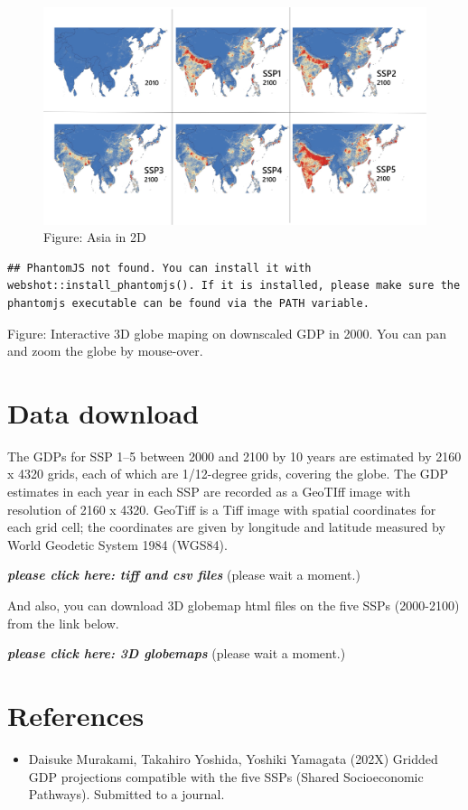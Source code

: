 \documentclass[]{book}
\providecommand{\tightlist}{%
  \setlength{\itemsep}{0pt}\setlength{\parskip}{0pt}}
\begin{document}
\begin{figure}
\centering
\includegraphics{Asia.png}
\caption{Figure: Asia in 2D}
\end{figure}

\begin{verbatim}
## PhantomJS not found. You can install it with webshot::install_phantomjs(). If it is installed, please make sure the phantomjs executable can be found via the PATH variable.
\end{verbatim}

\hypertarget{UxLgvZzrZ8}{}

Figure: Interactive 3D globe maping on downscaled GDP in 2000. You can pan and zoom the globe by mouse-over.

\hypertarget{data-download}{%
\section{Data download}\label{data-download}}

The GDPs for SSP 1--5 between 2000 and 2100 by 10 years are estimated by 2160 x 4320 grids, each of which are 1/12-degree grids, covering the globe. The GDP estimates in each year in each SSP are recorded as a GeoTIff image with resolution of 2160 x 4320. GeoTiff is a Tiff image with spatial coordinates for each grid cell; the coordinates are given by longitude and latitude measured by World Geodetic System 1984 (WGS84).

\textbf{\emph{please click here: tiff and csv files}} (please wait a moment.)

And also, you can download 3D globemap html files on the five SSPs (2000-2100) from the link below.

\textbf{\emph{please click here: 3D globemaps}} (please wait a moment.)

\hypertarget{references}{%
\section{References}\label{references}}

\begin{itemize}
\tightlist
\item
  Daisuke Murakami, Takahiro Yoshida, Yoshiki Yamagata (202X) Gridded GDP projections compatible with the five SSPs (Shared Socioeconomic Pathways). Submitted to a journal.
\end{itemize}


\end{document}
